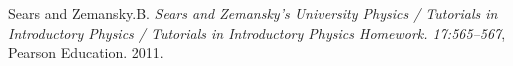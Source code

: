 \documentclass[DIV=calc, paper=a4, fontsize=11pt, twocolumn, spanish]{scrartcl}	 %
\begin{document}
\begin{thebibliography}{99} %

   Sears and Zemansky.B. {\em Sears and Zemansky's University Physics / Tutorials in Introductory Physics / Tutorials in Introductory Physics Homework. 17:565--567}, Pearson Education.  2011.
 
\end{thebibliography}

\end{document}
